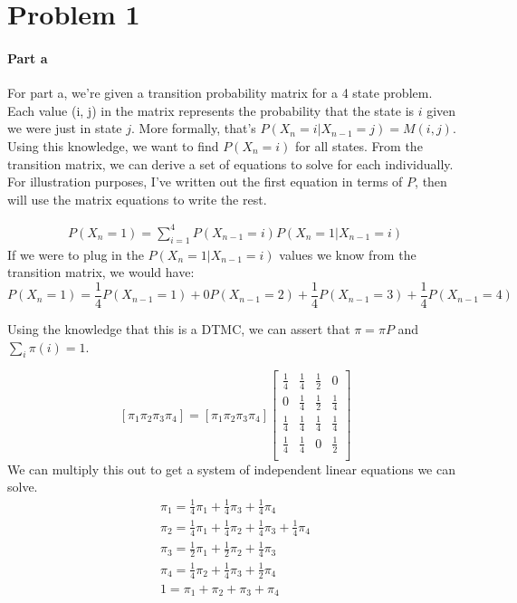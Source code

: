 \documentclass[12pt]{article}
\begin{document}
\maketitle

\section{Problem 1}

\paragraph{Part a} For part a, we're given a transition probability matrix for a 4 state problem. Each value (i, j) in the matrix represents the probability that the state is $i$ given we were just in state $j$. More formally, that's $P(X_n=i | X_{n-1}=j) = M(i, j)$. Using this knowledge, we want to find $P(X_n = i)$ for all states.
From the transition matrix, we can derive a set of equations to solve for each individually. For illustration purposes, I've written out the first equation in terms of $P$, then will use the matrix equations to write the rest.

\begin{gather}
  P(X_n=1) = \sum_{i=1}^4 P(X_{n-1}=i)P(X_n=1|X_{n-1}=i) \label{eq:mdp}
\end{gather}
If we were to plug in the $P(X_n=1|X_{n-1}=i)$ values we know from the transition matrix, we would have:
$$
  P(X_n=1) = \frac{1}{4}P(X_{n-1}=1) + 0P(X_{n-1}=2) + \frac{1}{4}P(X_{n-1}=3) + \frac{1}{4}P(X_{n-1}=4)
$$

Using the knowledge that this is a DTMC, we can assert that $\pi = \pi P$ and $\sum_i \pi(i) = 1$.

$$
  [\pi_1 \pi_2 \pi_3 \pi_4] = [\pi_1 \pi_2 \pi_3 \pi_4]\begin{bmatrix}
    \frac{1}{4} & \frac{1}{4} & \frac{1}{2} & 0           \\
    0           & \frac{1}{4} & \frac{1}{2} & \frac{1}{4} \\
    \frac{1}{4} & \frac{1}{4} & \frac{1}{4} & \frac{1}{4} \\
    \frac{1}{4} & \frac{1}{4} & 0           & \frac{1}{2} \\
  \end{bmatrix}
$$
We can multiply this out to get a system of independent linear equations we can solve.
\begin{gather*}
  \pi_1 = \frac{1}{4}\pi_1 + \frac{1}{4}\pi_3 + \frac{1}{4}\pi_4 \\
  \pi_2 = \frac{1}{4}\pi_1 + \frac{1}{4}\pi_2 + \frac{1}{4}\pi_3 + \frac{1}{4}\pi_4 \\
  \pi_3 = \frac{1}{2}\pi_1 + \frac{1}{2}\pi_2 + \frac{1}{4}\pi_3 \\
  \pi_4 = \frac{1}{4}\pi_2 + \frac{1}{4}\pi_3 + \frac{1}{2}\pi_4 \\
  1 = \pi_1 + \pi_2 + \pi_3 + \pi_4
\end{gather*}
\end{document}

